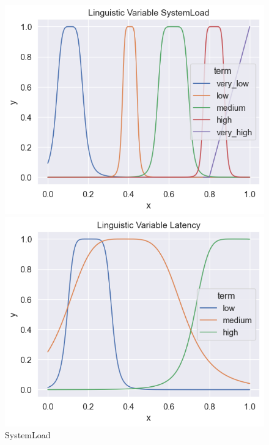 \documentclass[titlepage]{article}
\begin{document}
\begin{figure}[H]
    \centering
    \begin{minipage}{0.32\textwidth}
        \centering
        \includegraphics[width=\textwidth]{../../fuzzy/output/mamdani_bell_hyper/io_graphs/SystemLoad}
        \caption{SystemLoad}
        \label{fig:bell_hyper_system_load}
    \end{minipage}
    \hfill
    \begin{minipage}{0.32\textwidth}
        \centering
        \includegraphics[width=\textwidth]{../../fuzzy/output/mamdani_bell_hyper/io_graphs/Latency}

\end{minipage}
\end{figure}
\end{document}
